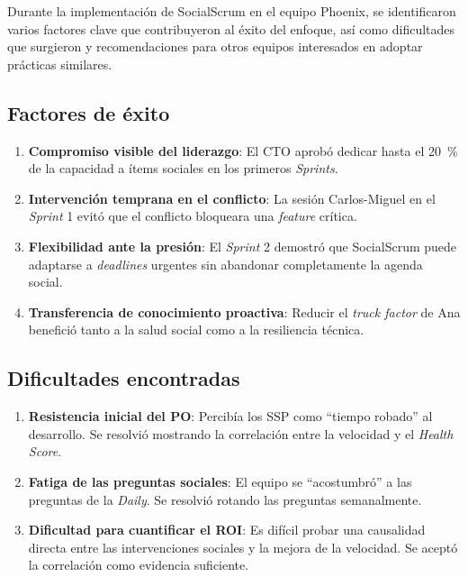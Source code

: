 Durante la implementación de SocialScrum en el equipo Phoenix, se identificaron varios factores clave que contribuyeron al éxito del enfoque, así como dificultades que surgieron y recomendaciones para otros equipos interesados en adoptar prácticas similares.

\subsection{Factores de éxito}

\begin{enumerate}
    \item \textbf{Compromiso visible del liderazgo}: El CTO aprobó dedicar hasta el 20~\% de la capacidad a ítems sociales en los primeros \textit{Sprints}.
    \item \textbf{Intervención temprana en el conflicto}: La sesión Carlos-Miguel en el \textit{Sprint} 1 evitó que el conflicto bloqueara una \textit{feature} crítica.
    \item \textbf{Flexibilidad ante la presión}: El \textit{Sprint} 2 demostró que SocialScrum puede adaptarse a \textit{deadlines} urgentes sin abandonar completamente la agenda social.
    \item \textbf{Transferencia de conocimiento proactiva}: Reducir el \textit{truck factor} de Ana benefició tanto a la salud social como a la resiliencia técnica.
\end{enumerate}

\subsection{Dificultades encontradas}

\begin{enumerate}
    \item \textbf{Resistencia inicial del PO}: Percibía los SSP como ``tiempo robado'' al desarrollo. Se resolvió mostrando la correlación entre la velocidad y el \textit{Health Score}.
    \item \textbf{Fatiga de las preguntas sociales}: El equipo se ``acostumbró'' a las preguntas de la \textit{Daily}. Se resolvió rotando las preguntas semanalmente.
    \item \textbf{Dificultad para cuantificar el ROI}: Es difícil probar una causalidad directa entre las intervenciones sociales y la mejora de la velocidad. Se aceptó la correlación como evidencia suficiente.
\end{enumerate}


